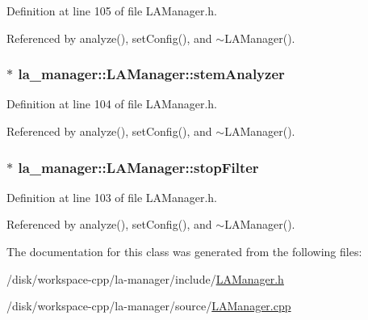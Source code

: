 Definition at line 105 of file LAManager.h.

Referenced by analyze(), setConfig(), and $\sim$LAManager().\hypertarget{classla__manager_1_1LAManager_7be7239a75586a86593c75ec965c7dec}{
\subsubsection[{stemAnalyzer}]{$\ast$ {\bf la\_\-manager::LAManager::stemAnalyzer}}}
\label{classla__manager_1_1LAManager_7be7239a75586a86593c75ec965c7dec}




Definition at line 104 of file LAManager.h.

Referenced by analyze(), setConfig(), and $\sim$LAManager().\hypertarget{classla__manager_1_1LAManager_3bad82627c93c35a8ff18799e7d45f3e}{
\subsubsection[{stopFilter}]{$\ast$ {\bf la\_\-manager::LAManager::stopFilter}}}
\label{classla__manager_1_1LAManager_3bad82627c93c35a8ff18799e7d45f3e}




Definition at line 103 of file LAManager.h.

Referenced by analyze(), setConfig(), and $\sim$LAManager().

The documentation for this class was generated from the following files:\begin{CompactItemize}
\item 
/disk/workspace-cpp/la-manager/include/\hyperlink{LAManager_8h}{LAManager.h}\item 
/disk/workspace-cpp/la-manager/source/\hyperlink{LAManager_8cpp}{LAManager.cpp}\end{CompactItemize}
